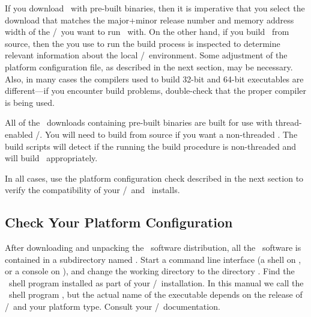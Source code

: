 If you download \OOMMF\ with pre-built binaries, then it is imperative
that you select the download that matches the major+minor release
number and memory address width of the \Tcl/\Tk\ you want to run
\OOMMF\ with.  On the other hand, if you build \OOMMF\ from source,
then the  you use to run the build process is inspected to
determine relevant information about the local \Tcl/\Tk\ environment.
Some adjustment of the platform
configuration file, as described in the next section, may be
necessary.  Also, in many cases the compilers used to build 32-bit and
64-bit executables are different---if you encounter build problems,
double-check that the proper compiler is being used.

All of the \OOMMF\ downloads containing pre-built binaries are built for
use with thread-enabled \Tcl/\Tk.  You will need to build from source if
you want a non-threaded \OOMMF.  The build scripts will detect if the
 running the build procedure is non-threaded and will build
\OOMMF\ appropriately.

In all cases, use the platform configuration check described in the next
section to verify the compatibility of your \Tcl/\Tk\ and \OOMMF\
installs.

\subsection{Check Your Platform Configuration}
\label{sec:install.platformconfig}

After downloading and unpacking the \OOMMF\ software distribution, all
the \OOMMF\ software is contained in a subdirectory named \fn{oommf}.
Start a command line interface (a shell on \Unix, or a console
on \Windows), and change the
working directory to the
directory .
Find the \Tcl\ shell program installed as part of your \Tcl/\Tk\
installation.  In this manual we call the \Tcl\ shell program
\fn{tclsh}, but the actual name of the executable depends
on the release of \Tcl/\Tk\ and your platform type.  Consult
your \Tcl/\Tk\ documentation.

